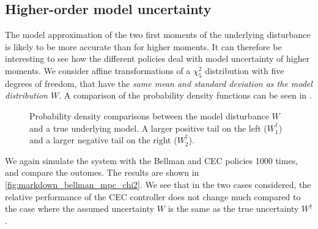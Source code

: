 \documentclass[main.tex]{subfiles}
\begin{document}
\subsection{Higher-order model uncertainty}
The model approximation of the two first moments of the underlying
disturbance is likely to be more accurate than for higher moments.
It can therefore be interesting to see how the different
policies deal with model uncertainty of higher moments.
We consider affine transformations of a $\chi^2_5$ distribution with five degrees of
freedom, that have the \emph{same mean and standard deviation as the model
distribution $W$}. A comparison of the probability density
functions can be seen in .
\begin{figure}[htbp]
  \centering
  \begin{subfigure}[b]{0.5\textwidth}
  \end{subfigure}%
  \begin{subfigure}[b]{0.5\textwidth}
  \end{subfigure}
  \caption{Probability density comparisons between
  the model disturbance $W$ and a true underlying
  model. A larger positive tail on the left ($W_1^\dagger$) and
  a larger negative tail on the right ($W_2^\dagger$).
}\label{fig:chisq_transformed}
\end{figure}
We again simulate the system with the Bellman and CEC policies 1000
times, and compare the outomes. The results are shown in
\cref{fig:markdown_bellman_mpc_chi2}. We see that in the two cases considered,
the relative performance of the CEC controller does not change much
compared to the case where the assumed uncertainty $W$ is the same as
the true uncertainty $W^\dagger$.
\end{document}
